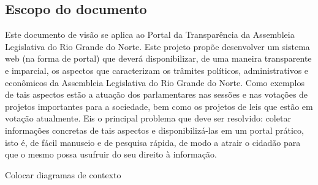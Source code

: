 \documentclass[12pt, a4paper]{article}
\begin{document}
        \subsection{Escopo do documento}
        Este documento de visão se aplica ao Portal da Transparência da
        Assembleia Legislativa do Rio Grande do Norte. Este projeto propõe
        desenvolver um sistema web (na forma de portal) que deverá
        disponibilizar, de uma maneira transparente e imparcial, os aspectos
        que caracterizam os trâmites políticos, administrativos e econômicos da
        Assembleia Legislativa do Rio Grande do Norte.  Como exemplos de tais
        aspectos estão a atuação dos parlamentares nas sessões e nas votações
        de projetos importantes para a sociedade, bem como os projetos de leis
        que estão em votação atualmente. Eis o principal problema que deve ser
        resolvido: coletar informações concretas de tais aspectos e
        disponibilizá-las em um portal prático, isto é, de fácil manuseio e de
        pesquisa rápida, de modo a atrair o cidadão para que o mesmo possa
        usufruir do seu direito à informação.

        {\color{red} Colocar diagramas de contexto}
\end{document}
